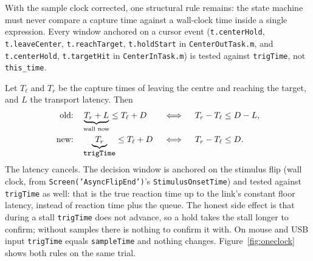 \documentclass[11pt,a4paper]{article}
\newcommand{\code}[1]{\texttt{\small #1}}
\newcommand{\file}[1]{\texttt{\small #1}}
\begin{document}
With the sample clock corrected, one structural rule remains: the state machine
must never compare a capture time against a wall-clock time inside a single
expression. Every window anchored on a cursor event (\code{t.centerHold},
\code{t.leaveCenter}, \code{t.reachTarget}, \code{t.holdStart} in
\file{CenterOutTask.m}, and \code{t.centerHold}, \code{t.targetHit} in
\file{CenterInTask.m}) is tested against \code{trigTime}, not \code{this\_time}.

Let $T_\ell$ and $T_r$ be the capture times of leaving the centre and reaching
the target, and $L$ the transport latency. Then
\begin{align}
  \text{old:}\quad & \underbrace{T_r + L}_{\text{wall now}} \le T_\ell + D
    &&\iff\quad T_r - T_\ell \le D - L, \label{eq:oldrule}\\
  \text{new:}\quad & \underbrace{T_r}_{\code{trigTime}} \le T_\ell + D
    &&\iff\quad T_r - T_\ell \le D. \label{eq:newrule}
\end{align}
The latency cancels. The decision window is anchored on the stimulus flip (wall
clock, from \code{Screen('AsyncFlipEnd')}'s \code{StimulusOnsetTime}) and tested
against \code{trigTime} as well: that is the true reaction time up to the link's
constant floor latency, instead of reaction time plus the queue. The honest side
effect is that during a stall \code{trigTime} does not advance, so a hold takes
the stall longer to confirm; without samples there is nothing to confirm it
with. On mouse and USB input \code{trigTime} equals \code{sampleTime} and
nothing changes. Figure~\ref{fig:oneclock} shows both rules on the same trial.
\end{document}
